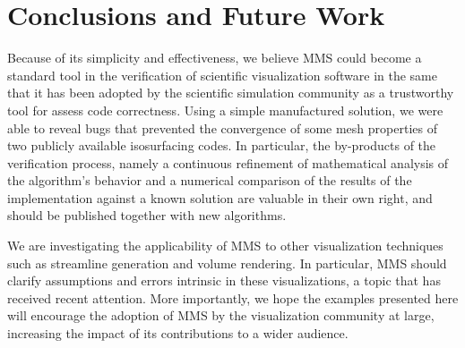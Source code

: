 \section{Conclusions and Future Work}

Because of its simplicity and effectiveness, we believe MMS could become a
standard tool in the verification of scientific visualization software 
in the same that it has been adopted by the scientific simulation community 
as a trustworthy tool for assess code correctness.
Using a simple manufactured solution, 
we were able to reveal bugs that prevented the convergence of 
some mesh properties of two publicly available isosurfacing codes.
In particular, the by-products of the verification process, namely
a continuous refinement of mathematical analysis of the algorithm's
behavior and a numerical comparison of the results of the 
implementation against a known solution are valuable in their own right, 
and should be published together with new algorithms.

We are investigating the applicability of MMS to other
visualization techniques such as streamline generation and volume
rendering. In particular, MMS should clarify assumptions and
errors intrinsic in these visualizations, a topic that has
received recent attention\cite{Johnson03}.  More importantly, we hope the 
examples presented here will encourage the adoption of MMS by the
visualization community at large, 
increasing the impact of its contributions 
to a wider audience.

